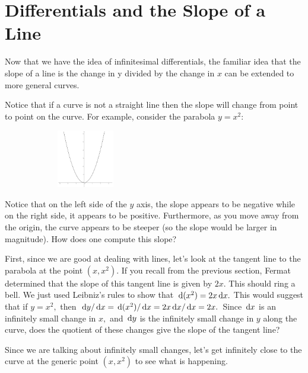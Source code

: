 \section{Differentials and the Slope of a Line}
\label{sec:diff-slope-line}

Now that we have the idea of infinitesimal differentials, the familiar
idea that the slope of a line is the change in y divided by the change
in $x$ can be extended to more general curves.

Notice that if a curve is not a straight line then the slope will
change from point to point on the curve.  For example, consider the
parabola $y=x^2:$
\begin{figure}
\captionsetup{labelformat=empty}
\centerline{\includegraphics*[height=1in,width=2in]{Figures/parabola1}}
\label{fig:}
\end{figure}

Notice that on the left side of the $y$ axis, the slope appears to be
negative while on the right side, it appears to be positive.
Furthermore, as you move away from the origin, the curve appears to be
steeper (so the slope would be larger in magnitude).  How does one
compute this slope? 

First, since we are good at dealing with lines, let's look at the
tangent line to the parabola at the point $(x,x^2).$ If you recall
from the previous section, Fermat determined that the slope of this
tangent line is given by $2x.$ This should ring a bell.  We just used
Leibniz's rules to show that $\thinspace{\rm d}(x^2)=2x\thinspace{\rm d}x.$ This would suggest
that if $y=x^2,$ then $\thinspace{\rm d}y/\thinspace{\rm d}x=\thinspace{\rm d}(x^2)/\thinspace{\rm d}x=2x\thinspace{\rm d}x/\thinspace{\rm d}x=2x.$ Since $\thinspace{\rm d}x$
is an infinitely small change in $x,$ and $\thinspace{\rm d}y$ is the infinitely
small change in $y$ along the curve, does the quotient of these
changes give the slope of the tangent line?

Since we are talking about infinitely small changes, let's get
infinitely close to the curve at the generic point $(x,x^2)$ to see
what is happening.

